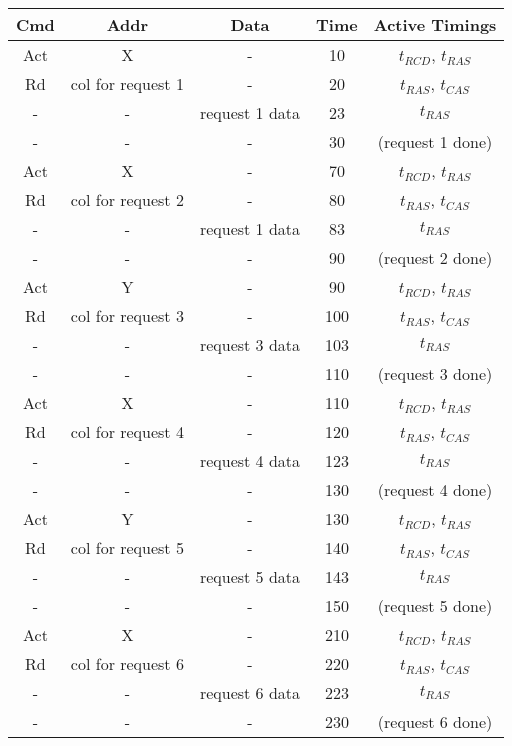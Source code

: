 \documentclass[a4paper, 11pt]{exam}
\begin{document}
\begin{enumerate}
\begin{center}
	\begin{tabular}{|c|c|c|c|c|}
		\hline
		\textbf{Cmd} & \textbf{Addr} & \textbf{Data} & \textbf{Time} & \textbf{Active Timings}\\
		\hline
		Act & X & - & 10 & $t_{RCD}$, $t_{RAS}$\\ 
		\hline
		Rd & col for request 1 & - & 20 &  $t_{RAS}$, $t_{CAS}$\\
		\hline
		- & - & request 1 data & 23 & $t_{RAS}$ \\
		\hline
		- & - & - & 30 & (request 1 done)\\
		\hline
		Act & X & - & 70 & $t_{RCD}$, $t_{RAS}$\\ 
		\hline
		Rd & col for request 2 & - & 80 &  $t_{RAS}$, $t_{CAS}$\\
		\hline
		- & - & request 1 data & 83 & $t_{RAS}$ \\
		\hline
		- & - & - & 90 & (request 2 done)\\
		\hline
		Act & Y & - & 90 & $t_{RCD}$, $t_{RAS}$\\ 
		\hline
		Rd & col for request 3 & - & 100 &  $t_{RAS}$, $t_{CAS}$\\
		\hline
		- & - & request 3 data & 103 & $t_{RAS}$ \\
		\hline
		- & - & - & 110 & (request 3 done)\\
		\hline
		Act & X & - & 110 & $t_{RCD}$, $t_{RAS}$\\ 
		\hline
		Rd & col for request 4 & - & 120 &  $t_{RAS}$, $t_{CAS}$\\
		\hline
		- & - & request 4 data & 123 & $t_{RAS}$ \\
		\hline
		- & - & - & 130 & (request 4 done)\\
		\hline
		Act & Y & - & 130 & $t_{RCD}$, $t_{RAS}$\\ 
		\hline
		Rd & col for request 5 & - & 140 &  $t_{RAS}$, $t_{CAS}$\\
		\hline
		- & - & request 5 data & 143 & $t_{RAS}$ \\
		\hline
		- & - & - & 150 & (request 5 done)\\
		\hline
		Act & X & - & 210 & $t_{RCD}$, $t_{RAS}$\\ 
		\hline
		Rd & col for request 6 & - & 220 &  $t_{RAS}$, $t_{CAS}$\\
		\hline
		- & - & request 6 data & 223 & $t_{RAS}$ \\
		\hline
		- & - & - & 230 & (request 6 done)\\
		\hline
	\end{tabular}
\end{center}


\end{enumerate}
\end{document}
